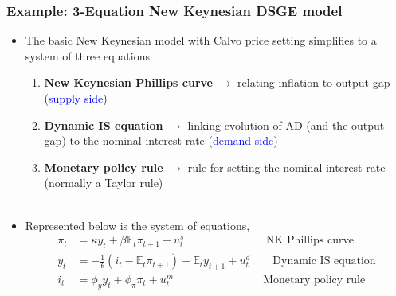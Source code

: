 \documentclass[10pt, xcolor=x11names, table]{beamer}
\begin{document}
\begin{frame}
\frametitle{Example: 3-Equation New Keynesian DSGE model}
\begin{itemize}
\item The basic New Keynesian model with Calvo price setting simplifies to a system of three equations
\begin{enumerate}
\item \textbf{New Keynesian Phillips curve} $\rightarrow$ relating inflation to output gap (\textcolor{blue}{supply side})
\item \textbf{Dynamic IS equation} $\rightarrow$ linking evolution of AD (and the output gap) to the nominal interest rate (\textcolor{blue}{demand side})
\item \textbf{Monetary policy rule} $\rightarrow$ rule for setting the nominal interest rate (normally a Taylor rule)\\~\\
\end{enumerate}
\item Represented below is the system of equations,
\begin{align*}
\pi_{t} &= \kappa{y_{t}} + \beta{\mathbb{E}_{t}}\pi_{t+1} + u_{t}^{s} \,\,\quad\qquad\qquad\qquad \text{NK Phillips curve}\\
y_{t} &= -\frac{1}{\theta}(i_{t} - \mathbb{E}_{t}\pi_{t+1}) + \mathbb{E}_{t}y_{t+1} + u_{t}^{d} \qquad \text{Dynamic IS equation}\\
i_{t} &= \phi_{y}y_{t} + \phi_{\pi}\pi_{t} + u_{t}^{m} \quad\quad\qquad\qquad\qquad \text{Monetary policy rule}
\end{align*}
\end{itemize}
\end{frame}
\end{document}
